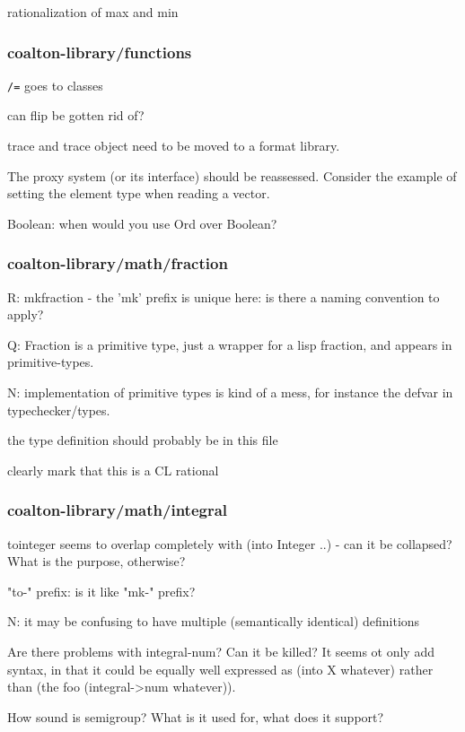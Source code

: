 \documentclass[12pt]{article}
\newcommand{\code}{\texttt}
\begin{document}
rationalization of max and min

\subsubsection{coalton-library/functions}

\code{/=} goes to classes

can flip be gotten rid of?

trace and trace object need to be moved to a format library.

The proxy system (or its interface) should be reassessed. Consider
the example of setting the element type when reading a vector.

Boolean: when would you use Ord over Boolean?

\subsubsection{coalton-library/math/fraction}

R: mkfraction - the 'mk' prefix is unique here: is there a naming convention to apply?

Q: Fraction is a primitive type, just a wrapper for a lisp fraction, and appears in primitive-types.

N: implementation of primitive types is kind of a mess, for instance
the defvar in typechecker/types.

the type definition should probably be in this file

clearly mark that this is a CL rational

\subsubsection{coalton-library/math/integral}

tointeger seems to overlap completely with (into Integer ..)
- can it be collapsed? What is the purpose, otherwise?

"to-" prefix: is it like "mk-" prefix?

N: it may be confusing to have multiple (semantically identical)
definitions

Are there problems with integral-\gt{}num? Can it be killed? It seems
ot only add syntax, in that it could be equally well expressed as
(into X whatever) rather than (the foo (integral->num whatever)).

How sound is semigroup? What is it used for, what does it support?
\end{document}
